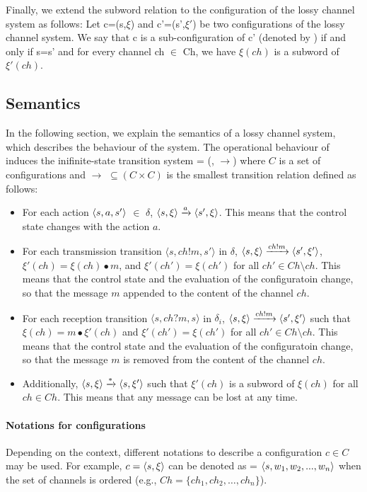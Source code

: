 Finally, we extend the subword relation to the configuration of the lossy channel system as follows: Let c=(s,$\xi$) and c'=(s',$\xi'$) be two configurations of the lossy channel system. We say that c is a sub-configuration of c' (denoted by ) if and only if s=s' and for every channel ch $\in$ Ch, we have $\xi(ch)$ is a subword of $\xi'(ch)$.

\subsection{Semantics}
\label{LTS}
In the following section, we explain the semantics of a lossy channel system, which describes the behaviour of the system. The operational behaviour of  induces the inifinite-state transition system  = (, $\rightarrow$) where $C$ is a set of configurations and $\rightarrow$ $\subseteq (C \times C)$ is the smallest transition relation defined as follows:
  \begin{itemize}
    \item For each action $\langle s, a, s'\rangle$ $\in$ $\delta$, $\langle s, \xi\rangle \xrightarrow{a} \langle s', \xi\rangle$. This means that the control state changes with the action $a$.
    \item For each transmission transition $\langle s, ch!m, s' \rangle$ in $\delta$, $\langle s, \xi\rangle \xrightarrow{ch!m} \langle s', \xi'\rangle$, $\xi'(ch) = \xi(ch)\bullet m$, and $\xi'(ch')=\xi(ch')$ for all $ch' \in Ch \setminus ch$. This means that the control state and the evaluation of the configuratoin change, so that the message $m$ appended to the content of the channel $ch$.
    \item For each reception transition $\langle s, ch?m, s \rangle$ in $\delta_i$, $\langle s, \xi\rangle \xrightarrow{ch!m} \langle s', \xi'\rangle$ such that $\xi(ch)=m \bullet \xi'(ch) $ and $\xi'(ch')=\xi(ch')$ for all $ch' \in Ch \setminus ch$. This means that the control state and the evaluation of the configuratoin change, so that the message $m$ is removed from the content of the channel $ch$.
    \item Additionally, $\langle s, \xi\rangle \xrightarrow{*} \langle s, \xi'\rangle$ such that $\xi'(ch)$ is a subword of $\xi(ch)$ for all $ch \in Ch$. This means that any message can be lost at any time.
  \end{itemize}

\paragraph{Notations for configurations}
Depending on the context, different notations to describe a configuration $c\in C$ may be used. For example, $c = \langle s, \xi\rangle$ can be denoted as  = $\langle s, w_1, w_2, ..., w_n\rangle$ when the set of channels is ordered (e.g., $Ch=\{ch_1,ch_2, \ldots,ch_n\}$).

